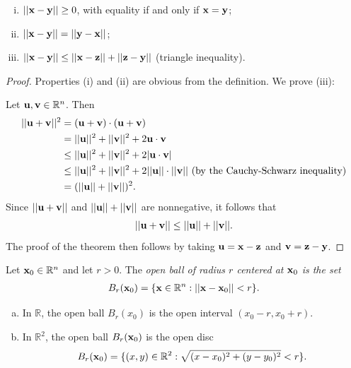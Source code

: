 \documentclass[12pt,letterpaper,reqno]{article}
\numberwithin{equation}{section}
\newcommand{\R}{\ensuremath{\mathbb R}}
\newcommand{\bu}{{\bf u}}
\newcommand{\bv}{{\bf v}}
\newcommand{\bx}{{\bf x}}
\newcommand{\by}{{\bf y}}
\newcommand{\bz}{{\bf z}}
\begin{document}
{\begin{thm}\label{thm:props_of_the_distance_function}
	\begin{enumerate}[(i)]\hspace{15cm}
		\item $||\bx-\by||\geq 0$, with equality if and only if $\bx=\by$;
		\item $||\bx-\by||=||\by-\bx||$;
		\item $||\bx-\by||\leq ||\bx-\bz||+||\bz-\by||$ (triangle inequality).
	\end{enumerate}
\end{thm}

\begin{proof}
Properties (i) and (ii) are obvious from the definition. We prove (iii):

Let $\bu, \bv \in \R^n$. Then
\begin{align*}
	||\bu+\bv||^2&=(\bu+\bv)\cdot (\bu+\bv) \\
	&=||\bu||^2+||\bv||^2+2\bu \cdot \bv \\
	&\leq ||\bu||^2+||\bv||^2+2|\bu \cdot \bv| \\
	&\leq ||\bu||^2+||\bv||^2+2||\bu|| \cdot ||\bv|| \text{ (by the Cauchy-Schwarz inequality)} \\
	&=(||\bu||+||\bv||)^2.
\end{align*}	
Since $||\bu+\bv||$ and $||\bu||+||\bv||$ are nonnegative, it follows that
\begin{align*}
	||\bu+\bv|| \leq ||\bu||+||\bv||.
\end{align*}
The proof of the theorem then follows by taking $\bu=\bx-\bz$ and $\bv=\bz-\by$.
\end{proof}

\begin{defn}
	Let $\bx_0 \in \R^n$ and let $r>0$. The \emph{open ball of radius $r$ centered at $\bx_0$ is the set}	
	\begin{align*}
		B_r(\bx_0)=\{ \bx \in \R^n:||\bx-\bx_0||<r \}.
	\end{align*}	
\end{defn}

\begin{example}\hspace{15cm}
	\begin{enumerate}[(a)]
		\item In $\R$, the open ball $B_r(x_0)$ is the open interval $(x_0-r,x_0+r)$.
		\item In $\R^2$, the open ball $B_r(\bx_0)$ is the open disc
		\begin{align*}
			B_r(\bx_0)=\{(x,y) \in \R^2:\sqrt{(x-x_0)^2+(y-y_0)^2}<r\}.
		\end{align*}
	\end{enumerate}
\end{example}

}
\end{document}
